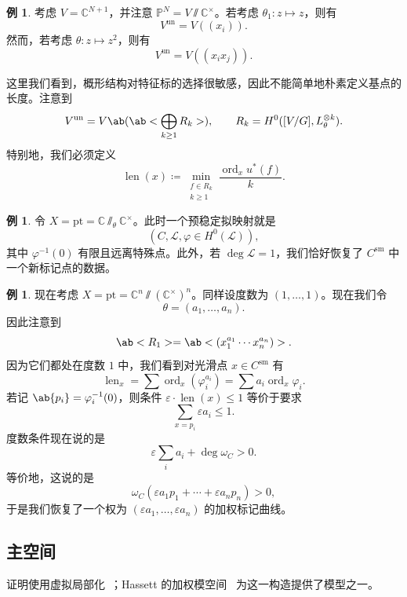 \documentclass{amsart}
\theoremstyle{definition}
\newtheorem{exm}[thm]{例}
\theoremstyle{remark}
\theoremstyle{plain}
\theoremstyle{definition}
\theoremstyle{remark}
\newcommand{\C}{\mathbb{C}}
\renewcommand{\P}{\mathbb{P}}
\newcommand{\ep}{\varepsilon}
\newcommand{\mc}[1]{\mathcal{#1}}
\newcommand{\mr}[1]{\mathrm{#1}}
\newcommand{\on}[1]{\operatorname{#1}}
\newcommand{\1}{\mathbf{1}}
\newcommand{\2}{\mathbf{2}}
\newcommand{\3}{\mathbf{3}}
\begin{document}
\begin{exm}
    考虑 \(V = \C^{N+1}\)，并注意 \(\P^N = V \sslash \C^{\times}\)。若考虑 \(\theta_1 \colon z \mapsto z\)，则有 
    \[ V^{\on{un}} = V((x_i)). \]
    然而，若考虑 \(\theta \colon z \mapsto z^2\)，则有
    \[ V^{\on{un}} = V((x_i x_j)). \]
\end{exm}

这里我们看到，概形结构对特征标的选择很敏感，因此不能简单地朴素定义基点的长度。注意到
\[ V^{\on{un}} = V\ab(\ab< \bigoplus_{k \geq 1} R_k>), \qquad R_k = H^0([V/G], L_{\theta}^{\otimes k}). \]
特别地，我们必须定义
\[ \on{len}(x) \coloneqq \min_{\substack{f \in R_k \\ k \geq 1}} \frac{\on{ord}_x u^*(f)}{k}. \]

\begin{exm}
    令 \(X = \mr{pt} = \C \sslash_{\theta} \C^{\times}\)。此时一个预稳定拟映射就是
    \[ (C, \mc{L}, \varphi \in H^0(\mc{L})), \]
    其中 \(\varphi^{-1}(0)\) 有限且远离特殊点。此外，若 \(\deg \mc{L} = 1\)，我们恰好恢复了 \(C^{\mr{sm}}\) 中一个新标记点的数据。
\end{exm}

\begin{exm}
    现在考虑 \(X = \mr{pt} = \C^n \sslash (\C^{\times})^n\)。同样设度数为 \((1, \ldots, 1)\)。现在我们令
    \[ \theta = (a_1, \ldots, a_n). \]
    因此注意到
    \[ \ab<R_1> = \ab<(x_1^{a_1} \cdots x_n^{a_n})>. \]
    因为它们都处在度数 \(1\) 中，我们看到对光滑点 \(x \in C^{\mr{sm}}\) 有
    \[ \on{len}_x = \sum \on{ord}_x (\varphi_i^{a_i}) = \sum a_i \on{ord}_x \varphi_i. \]
    若记 \(\ab\{p_i\} = \varphi_i^{-1}(0)\)，则条件 \(\ep \cdot \on{len}(x) \leq 1\) 等价于要求 
    \[ \sum_{x = p_i} \ep a_i \leq 1. \]
    度数条件现在说的是
    \[ \ep \sum_i a_i + \deg \omega_C > 0. \]
    等价地，这说的是
    \[ \omega_C(\ep a_1 p_1 + \cdots + \ep a_n p_n) > 0, \]
    于是我们恢复了一个权为 \((\ep a_1, \ldots, \ep a_n)\) 的加权标记曲线。
\end{exm}

\subsection{主空间}%
\label{sub:Master space}

证明使用虚拟局部化~\cite{GP1999}；Hassett 的加权模空间~\cite{Hassett2003} 为这一构造提供了模型之一。
\end{document}
